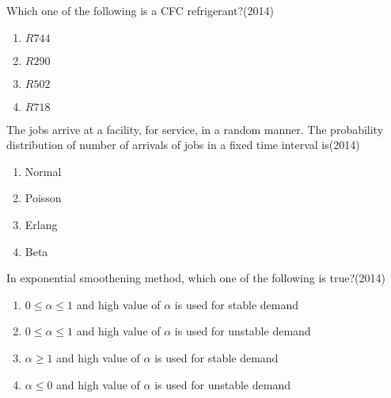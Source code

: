 \iffalse
\chapter{2014}
\author{AI24BTECH11022}
\section{me}
\fi

\item Which one of the following is a CFC refrigerant?\hfill(2014)
\begin{multicols}{2}
\begin{enumerate}
\item $R744$
\item $R290$
\item $R502$
\item $R718$
\end{enumerate}
\end{multicols}


\item The jobs arrive at a facility, for service, in a random manner. The probability distribution of number of arrivals of jobs in a fixed time interval is\hfill(2014)
\begin{multicols}{2}
\begin{enumerate}
\item Normal
\item Poisson
\item Erlang
\item Beta
\end{enumerate}
\end{multicols}


\item In exponential smoothening method, which one of the following is true?\hfill(2014)
\begin{enumerate}
\item $0\leq\alpha\leq1$ and high value of $\alpha$ is used for stable demand
\item $0\leq\alpha\leq1$ and high value of $\alpha$ is used for unstable demand
\item $\alpha\geq 1$ and high value of $\alpha$ is used for stable demand
\item $\alpha\leq 0$ and high value of $\alpha$ is used for unstable demand
\end{enumerate}


